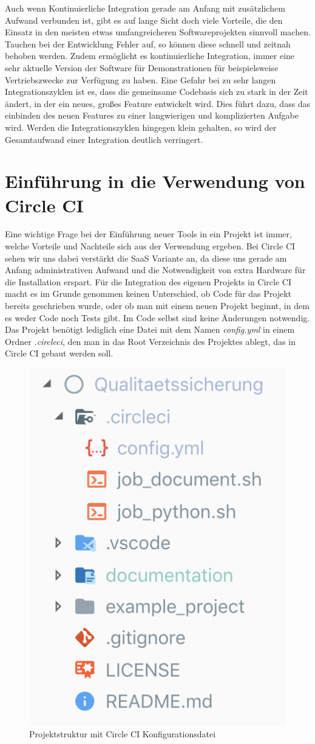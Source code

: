 \documentclass[11pt]{article}
\begin{document}
Auch wenn Kontinuierliche Integration gerade am Anfang mit zusätzlichem Aufwand verbunden ist, gibt es auf lange Sicht doch viele Vorteile, die den Einsatz in den meisten etwas umfangreicheren Softwareprojekten sinnvoll machen. Tauchen bei der Entwicklung Fehler auf, so können diese schnell und zeitnah behoben werden. Zudem ermöglicht es kontinuierliche Integration, immer eine sehr aktuelle Version der Software für Demonstrationen für beispielsweise Vertriebszwecke zur Verfügung zu haben. Eine Gefahr bei zu sehr langen Integrationszyklen ist es, dass die gemeinsame Codebasis sich zu stark in der Zeit ändert, in der ein neues, großes Feature entwickelt wird. Dies führt dazu, dass das einbinden des neuen Features zu einer langwierigen und komplizierten Aufgabe wird. Werden die Integrationszyklen hingegen klein gehalten, so wird der Gesamtaufwand einer Integration deutlich verringert.

\section{Einführung in die Verwendung von Circle CI}
Eine wichtige Frage bei der Einführung neuer Tools in ein Projekt ist immer, welche Vorteile und Nachteile sich aus der Verwendung ergeben. Bei Circle CI sehen wir uns dabei verstärkt die SaaS Variante an, da diese uns gerade am Anfang administrativen Aufwand und die Notwendigkeit von extra Hardware für die Installation erspart. Für die Integration des eigenen Projekts in Circle CI macht es im Grunde genommen keinen Unterschied, ob Code für das Projekt bereits geschrieben wurde, oder ob man mit einem neuen Projekt beginnt, in dem es weder Code noch Tests gibt. Im Code selbst sind keine Änderungen notwendig. Das Projekt benötigt lediglich eine Datei mit dem Namen \textit{config.yml} in einem Ordner \textit{.circleci}, den man in das Root Verzeichnis des Projektes ablegt, das in Circle CI gebaut werden soll.

\begin{figure}[H]
	\centering
  	\includegraphics[width=0.3\linewidth]{../Images/Projektstruktur}
  	\caption{Projektstruktur mit Circle CI Konfigurationsdatei}
  	\label{fig:project-structure}
\end{figure}
\end{document}

